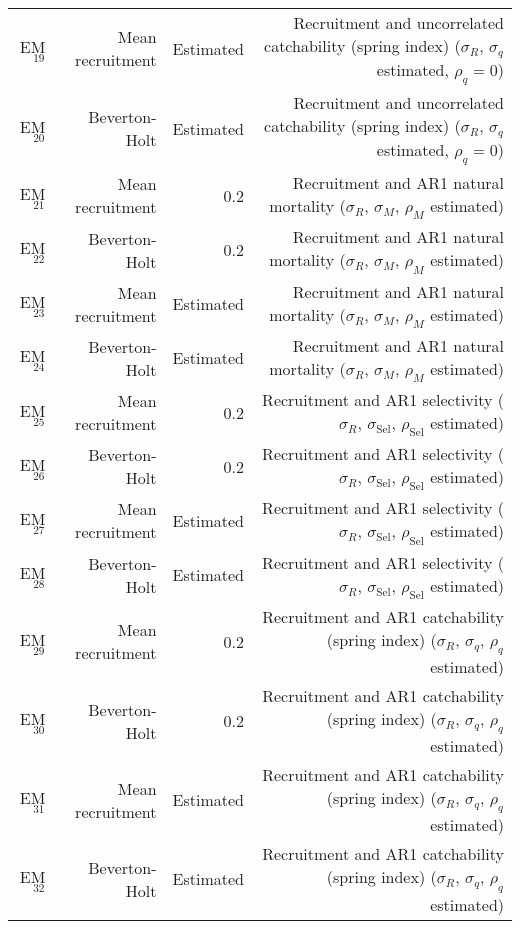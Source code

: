 \begin{center}
\begin{tabular}{rrrr}
EM$_{19}$&Mean recruitment&Estimated&Recruitment and uncorrelated catchability (spring index) ($\sigma_R$, $\sigma_{q}$ estimated, $\rho_{q} = 0$)\tabularnewline
EM$_{20}$&Beverton-Holt&Estimated&Recruitment and uncorrelated catchability (spring index) ($\sigma_R$, $\sigma_{q}$ estimated, $\rho_{q} = 0$)\tabularnewline
EM$_{21}$&Mean recruitment&0.2&Recruitment and AR1 natural mortality ($\sigma_R$, $\sigma_{M}$, $\rho_{M}$ estimated)\tabularnewline
EM$_{22}$&Beverton-Holt&0.2&Recruitment and AR1 natural mortality ($\sigma_R$, $\sigma_{M}$, $\rho_{M}$ estimated)\tabularnewline
EM$_{23}$&Mean recruitment&Estimated&Recruitment and AR1 natural mortality ($\sigma_R$, $\sigma_{M}$, $\rho_{M}$ estimated)\tabularnewline
EM$_{24}$&Beverton-Holt&Estimated&Recruitment and AR1 natural mortality ($\sigma_R$, $\sigma_{M}$, $\rho_{M}$ estimated)\tabularnewline
EM$_{25}$&Mean recruitment&0.2&Recruitment and AR1 selectivity ($\sigma_R$, $\sigma_{\text{Sel}}$, $\rho_{\text{Sel}}$ estimated)\tabularnewline
EM$_{26}$&Beverton-Holt&0.2&Recruitment and AR1 selectivity ($\sigma_R$, $\sigma_{\text{Sel}}$, $\rho_{\text{Sel}}$ estimated)\tabularnewline
EM$_{27}$&Mean recruitment&Estimated&Recruitment and AR1 selectivity ($\sigma_R$, $\sigma_{\text{Sel}}$, $\rho_{\text{Sel}}$ estimated)\tabularnewline
EM$_{28}$&Beverton-Holt&Estimated&Recruitment and AR1 selectivity ($\sigma_R$, $\sigma_{\text{Sel}}$, $\rho_{\text{Sel}}$ estimated)\tabularnewline
EM$_{29}$&Mean recruitment&0.2&Recruitment and AR1 catchability (spring index) ($\sigma_R$, $\sigma_{q}$, $\rho_{q}$ estimated)\tabularnewline
EM$_{30}$&Beverton-Holt&0.2&Recruitment and AR1 catchability (spring index) ($\sigma_R$, $\sigma_{q}$, $\rho_{q}$ estimated)\tabularnewline
EM$_{31}$&Mean recruitment&Estimated&Recruitment and AR1 catchability (spring index) ($\sigma_R$, $\sigma_{q}$, $\rho_{q}$ estimated)\tabularnewline
EM$_{32}$&Beverton-Holt&Estimated&Recruitment and AR1 catchability (spring index) ($\sigma_R$, $\sigma_{q}$, $\rho_{q}$ estimated)\tabularnewline
\hline
\end{tabular}\end{center}
